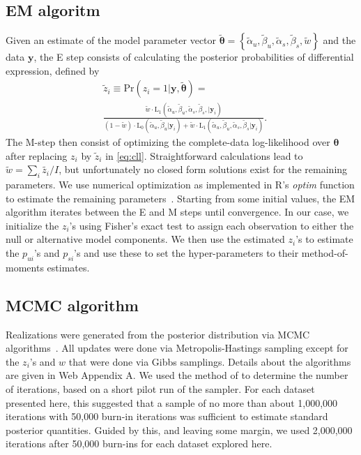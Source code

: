 \documentclass[useAMS,referee,usenatbib]{biom}
\begin{document}
\subsection{EM algoritm}
Given an estimate of the model parameter vector $\tilde{\boldsymbol{\theta}}=\left\{\tilde{\alpha}_u,\tilde{\beta}_u,\tilde{\alpha}_s,\tilde{\beta}_s,\tilde{w}\right\}$ and the data $\mathbf{y}$, the E step consists of calculating the posterior probabilities of differential expression, defined by
\[
\begin{split}
&\tilde z_{i} \equiv \mathrm{Pr}(z_i=1|\mathbf{y},\tilde{\boldsymbol{\theta}})=\\ &\frac{\tilde{w} \cdot \mathrm{L}_1(\tilde{\alpha}_u,\tilde{\beta}_u,\tilde{\alpha}_s,\tilde{\beta}_s,|\mathbf{y}_i)}{(1-\tilde{w})\cdot\mathrm{L}_0(\tilde{\alpha}_u,\tilde{\beta}_u|\mathbf{y}_i)+\tilde{w}\cdot\mathrm{L}_1(\tilde{\alpha}_u,\tilde{\beta}_u,\tilde{\alpha}_s,\tilde{\beta}_s|\mathbf{y}_i)}.
\end{split}
\] 
The M-step then consist of optimizing the complete-data log-likelihood over $\boldsymbol{\theta}$ after replacing $z_i$ by $\tilde{z}_{i}$ in \eqref{eq:cll}. Straightforward calculations lead to 
$\tilde w = \sum_i{\tilde{z_i}}/I$, but unfortunately no closed form solutions exist for the remaining parameters. We use numerical optimization as implemented in R's \textit{optim} function to estimate the remaining parameters~\citep{Ihaka:1996ud}.  Starting from some initial values, the EM algorithm iterates between the E and M steps until convergence. In our case, we initialize the $z_{i}$'s using Fisher's exact test to assign each observation to either the null or alternative model components. We then use the estimated $z_i$'s to estimate the $p_{ui}$'s and $p_{si}$'s and use these to set the hyper-parameters to their method-of-moments estimates.

\subsection{MCMC algorithm}
Realizations were generated from the posterior distribution via MCMC algorithms~\citep{Gelfand:1996wc}. All updates were done via Metropolis-Hastings sampling except for the $z_i$'s and $w$ that were done via Gibbs samplings.
Details about the algorithms are given in Web Appendix A. We used the method of \cite{Raftery:1992vp,Raftery:1996ws} to determine the number of iterations, based on a short pilot run of the sampler. For each dataset presented here, this suggested that a sample of no more than about 1,000,000 iterations with 50,000 burn-in iterations was sufficient to estimate standard posterior quantities. Guided by this, and leaving some margin, we used 2,000,000 iterations after 50,000  burn-ins for each dataset explored here. 
\end{document}
